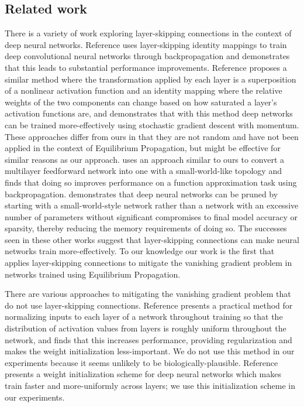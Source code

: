 \documentclass[utf8]{frontiersSCNS}
\begin{document}
\subsection{Related work}

There is a variety of work exploring layer-skipping connections in the context of deep neural networks. Reference \citep{he2015} uses layer-skipping identity mappings to train deep convolutional neural networks through backpropagation and demonstrates that this leads to substantial performance improvements. Reference \citep{srivastava2015} proposes a similar method where the transformation applied by each layer is a superposition of a nonlinear activation function and an identity mapping where the relative weights of the two components can change based on how saturated a layer's activation functions are, and demonstrates that with this method deep networks can be trained more-effectively using stochastic gradient descent with momentum. These approaches differ from ours in that they are not random and have not been applied in the context of Equilibrium Propagation, but might be effective for similar reasons as our approach. \citep{xiaohu2011} uses an approach similar to ours to convert a multilayer feedforward network into one with a small-world-like topology and finds that doing so improves performance on a function approximation task using backpropagation. \citep{krishnan2019} demonstrates that deep neural networks can be pruned by starting with a small-world-style network rather than a network with an excessive number of parameters without significant compromises to final model accuracy or sparsity, thereby reducing the memory requirements of doing so. The successes seen in these other works suggest that layer-skipping connections can make neural networks train more-effectively. To our knowledge our work is the first that applies layer-skipping connections to mitigate the vanishing gradient problem in networks trained using Equilibrium Propagation.

There are various approaches to mitigating the vanishing gradient problem that do not use layer-skipping connections. Reference \citep{ioffe2015} presents a practical method for normalizing inputs to each layer of a network throughout training so that the distribution of activation values from layers is roughly uniform throughout the network, and finds that this increases performance, providing regularization and makes the weight initialization less-important. We do not use this method in our experiments because it seems unlikely to be biologically-plausible. Reference \citep{glorot2010} presents a weight initialization scheme for deep neural networks which makes train faster and more-uniformly across layers; we use this initialization scheme in our experiments.
\end{document}
